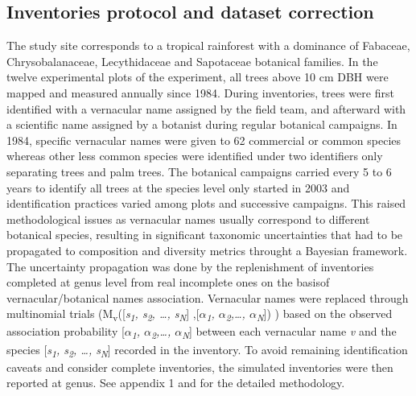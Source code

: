 \documentclass[fleqn,10pt]{ArtEcoFoG} %
\theoremstyle{definition}
\theoremstyle{definition}
\theoremstyle{definition}
\theoremstyle{remark}
\begin{document}
\subsection{Inventories protocol and dataset
correction}\label{inventories-protocol-and-dataset-correction}

The study site corresponds to a tropical rainforest with a dominance of
Fabaceae, Chrysobalanaceae, Lecythidaceae and Sapotaceae botanical
families. In the twelve experimental plots of the experiment, all trees
above 10 cm DBH were mapped and measured annually since 1984. During
inventories, trees were first identified with a vernacular name assigned
by the field team, and afterward with a scientific name assigned by a
botanist during regular botanical campaigns. In 1984, specific
vernacular names were given to 62 commercial or common species whereas
other less common species were identified under two identifiers only
separating trees and palm trees. The botanical campaigns carried every 5
to 6 years to identify all trees at the species level only started in
2003 and identification practices varied among plots and successive
campaigns. This raised methodological issues as vernacular names usually
correspond to different botanical species, resulting in significant
taxonomic uncertainties that had to be propagated to composition and
diversity metrics throught a Bayesian framework. The uncertainty
propagation was done by the replenishment of inventories completed at
genus level from real incomplete ones on the basisof
vernacular/botanical names association. Vernacular names were replaced
through multinomial trials
(M\textsubscript{v}({[}\emph{s\textsubscript{1}, s\textsubscript{2},
\ldots{}, s\textsubscript{N}}{]} ,{[}\emph{\(\alpha\)\textsubscript{1},
\(\alpha\)\textsubscript{2},\ldots{}, \(\alpha\)\textsubscript{N}}{]}) )
based on the observed association probability
{[}\emph{\(\alpha\)\textsubscript{1},
\(\alpha\)\textsubscript{2},\ldots{}, \(\alpha\)\textsubscript{N}}{]}
between each vernacular name \emph{v} and the species
{[}\emph{s\textsubscript{1}, s\textsubscript{2}, \ldots{},
s\textsubscript{N}}{]} recorded in the inventory. To avoid remaining
identification caveats and consider complete inventories, the simulated
inventories were then reported at genus. See appendix 1 and
\citet{Aubry-Kientz2013} for the detailed methodology.
\end{document}
